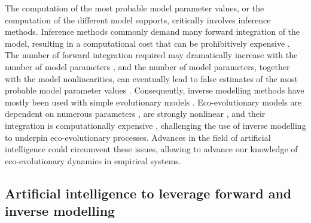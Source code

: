 The computation of the most probable model parameter values, or the computation of the different model supports, critically involves inference methods.
% 
Inference methods commonly demand many forward integration of the model, resulting in a computational cost that can be prohibitively expensive \citep{Schneider2017}.
% 
The number of forward integration required may dramatically increase with the number of model parameters \citep{Csillery2010}, and the number of model parameters, together with the model nonlinearities, can eventually lead to false estimates of the most probable model parameter values \citep{Gabor2015}.
% 
Consequently, inverse modelling methods have mostly been used with simple evolutionary models \citep{Csillery2010}. 
% 
Eco-evolutionary models are dependent on numerous parameters \citep{Boyd2012}, are strongly nonlinear \citep{Hastings1993,Huisman1999,Beninca2008}, and their integration is computationally expensive \citep{Fisher2018}, challenging the use of inverse modelling to underpin eco-evolutionary processes. 
% 
Advances in the field of artificial intelligence could circumvent these issues, allowing to advance our knowledge of eco-evolutionary dynamics in empirical systems.  

\subsection{Artificial intelligence to leverage forward and inverse modelling}

